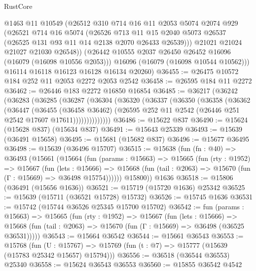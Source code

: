 \begin{lexlean}{RustCore}
\begin{coremodule}
          @1463
          @11
          @10549
          (@26512
            @310
            @714
            @16
            @11
            @2053
            @5074
            @2074
            @929
            (@26521
              @714
              @16
              @5074
              (@26526
                @713
                @11
                @15
                @2040
                @5073
                @26537
                (@26525 @131 @93 @11 @14 @2138 @2070 @26433 @26539)))
            @21021
            @21024
            @21027
            @21030
            @26548))
        (@26442 @10555 @2037 @26450 @26452 @16096 (@16079 (@16098 @10556 @2053)))
        @16096
        (@16079 (@16098 @10544 @10562)))
      @16114
      @16118
      @16123
      @16128
      @16134
      @20260)
@36455 := @26475 @10572 @184 @252 @11 @2053 @2272 @2053 @2542
@36458 := @26595 @184 @11 @2272
@36462 := @26446 @183 @2272 @16850 @16854
@36485 := @36217
    (@36242
      (@36283
        (@36285
          (@36287
            (@36304
              (@36320
                (@36337
                  (@36350
                    (@36358
                      (@36362
                        (@36447
                          (@36455
                            (@36458 @36462)
                            (@26595 @252 @11 @2542 (@26446 @251 @2542 @17607 @17611))))))))))))))
@36486 := @15622 @837
@36490 := @15624 (@15628 @837) (@15634 @837)
@36491 := @15643 @25339
@36493 := @15639 (@36491 @15658)
@36495 := @15681 (@15682 @837)
@36496 := @15677 @36495
@36498 := @15639 (@36496 @15707)
@36515 := @15638
    (fun (fn : @40) =>
    @36493
      (@15661
        (@15664
          (fun (params : @15663) =>
          @15665
            (fun (rty : @1952) =>
            @15667
              (fun (lets : @15666) =>
              @15668 (fun (tail : @2063) => @15670 (fun (Γ : @15669) => @36498 @15754))))))
        @15800))
    @1636
@36518 := @15806 (@36491 (@15656 @1636))
@36521 := @15719 (@15720 @1636) @25342
@36525 := @15639 (@15711 (@36521 @15728) @15732)
@36526 := @15745 @1636
@36531 := @15742 (@15744 @36526 @25345 @15700 @15702)
@36542 := fun (params : @15663) =>
  @15665
    (fun (rty : @1952) =>
    @15667
      (fun (lets : @15666) =>
      @15668 (fun (tail : @2063) => @15670 (fun (Γ : @15669) => @36498 (@36525 @36531)))))
@36543 := @15664 @36542
@36544 := @15661 @36543
@36553 := @15768
    (fun (U : @15767) => @15769 (fun (t : @7) => @15777 (@15639 (@15783 @25342 @15657) @15794)))
@36556 := @36518 (@36544 @36553) @25340
@36558 := @15624 @36543 @36553
@36560 := @15855 @36542 @4542

\end{coremodule}
\end{lexlean}

